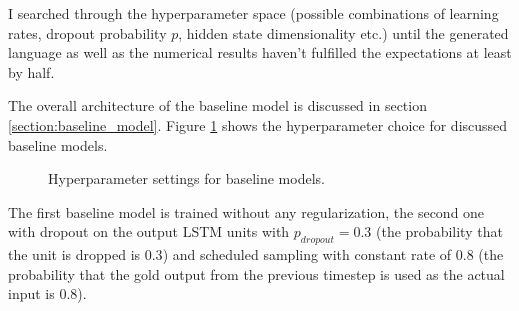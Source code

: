 I searched through the hyperparameter space (possible combinations of learning rates, dropout probability $p$, hidden state dimensionality etc.) until the generated language as well as the numerical results haven't fulfilled the expectations at least by half.

The overall architecture of the baseline model is discussed in section \ref{section:baseline_model}. Figure \ref{figure:hyperparameters_baseline} shows the hyperparameter choice for discussed baseline models.

\begin{figure}[h]
    \caption{Hyperparameter settings for baseline models.} \label{figure:hyperparameters_baseline}
\end{figure}

The first baseline model is trained without any regularization, the second one with dropout on the output LSTM units with $p_{dropout} = 0.3$ (the probability that the unit is dropped is $0.3$) and scheduled sampling with constant rate of $0.8$ (the probability that the gold output from the previous timestep is used as the actual input is $0.8$).

